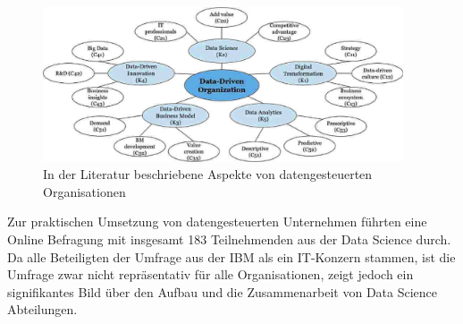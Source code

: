 \begin{figure}[htb]
    \centering
    \includegraphics[width=0.95\textwidth]{graphics/ddo aspects.png}
    \caption{In der Literatur beschriebene Aspekte von datengesteuerten Organisationen}
    \label{fig:DDOs aspects}
\end{figure}

Zur praktischen Umsetzung von datengesteuerten Unternehmen führten  eine Online Befragung mit insgesamt 183 Teilnehmenden aus der Data Science durch.
Da alle Beteiligten der Umfrage aus der IBM als ein IT-Konzern stammen, ist die Umfrage zwar nicht repräsentativ für alle Organisationen, zeigt jedoch ein signifikantes Bild über den Aufbau und die Zusammenarbeit von Data Science Abteilungen.
